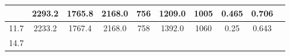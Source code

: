 \documentclass[a4paper,12pt]{article}
\begin{document}
\begin{longtable}{
     |
%    
    c|
%    
    c|
%    
    c|
%    
    c|
%    
    c|
%    
    c|
%    
    c|
%    
    c|
%    
    c|
%    
    c|
%    
    }
%        
        & 2293.2
%        

%        

%        
        & 1765.8
%        

%        

%        
        & 2168.0
%        

%        

%        
        & 756
%        

%        

%        
        & 1209.0
%        

%        

%        
        & 1005
%        

%        

%        
        & 0.465
%        

%        

%        
        & 0.706
%        

%        
        \\
        \hline

        

%        

%        
        11.7
%        

%        

%        
        & 2233.2
%        

%        

%        
        & 1767.4
%        

%        

%        
        & 2168.0
%        

%        

%        
        & 758
%        

%        

%        
        & 1392.0
%        

%        

%        
        & 1060
%        

%        

%        
        & 0.25
%        

%        

%        
        & 0.643
%        

%        
        \\
        \hline

        

%        

%        
        14.7
%        

%        


\end{longtable}
\end{document}

